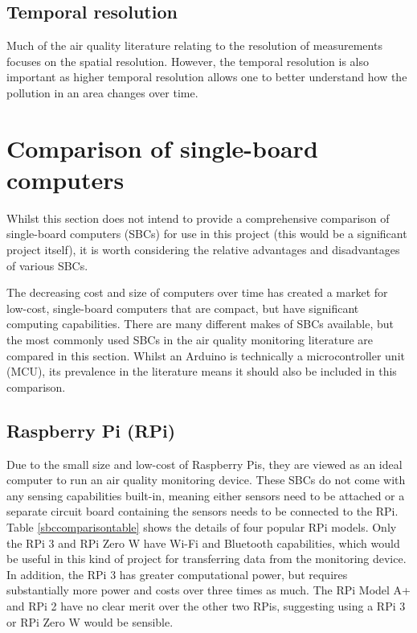 \documentclass[11pt,twosided,a4paper]{report}
\begin{document}
\subsection{Temporal resolution}

Much of the air quality literature relating to the resolution of measurements focuses on the spatial resolution. However, the temporal resolution is also important as higher temporal resolution allows one to better understand how the pollution in an area changes over time.


\section{Comparison of single-board computers}

Whilst this section does not intend to provide a comprehensive comparison of single-board computers (SBCs) for use in this project (this would be a significant project itself), it is worth considering the relative advantages and disadvantages of various SBCs.


The decreasing cost and size of computers over time has created a market for low-cost, single-board computers that are compact, but have significant computing capabilities. There are many different makes of SBCs available, but the most commonly used SBCs in the air quality monitoring literature are compared in this section. Whilst an Arduino is technically a microcontroller unit (MCU), its prevalence in the literature means it should also be included in this comparison.


\subsection{Raspberry Pi (RPi)}

Due to the small size and low-cost of Raspberry Pis, they are viewed as an ideal computer to run an air quality monitoring device. These SBCs do not come with any sensing capabilities built-in, meaning either sensors need to be attached or a separate circuit board containing the sensors needs to be connected to the RPi. Table \ref{sbccomparisontable} shows the details of four popular RPi models. Only the RPi 3 and RPi Zero W have Wi-Fi and Bluetooth capabilities, which would be useful in this kind of project for transferring data from the monitoring device. In addition, the RPi 3 has greater computational power, but requires substantially more power and costs over three times as much. The RPi Model A+ and RPi 2 have no clear merit over the other two RPis, suggesting using a RPi 3 or RPi Zero W would be sensible.
\end{document}
